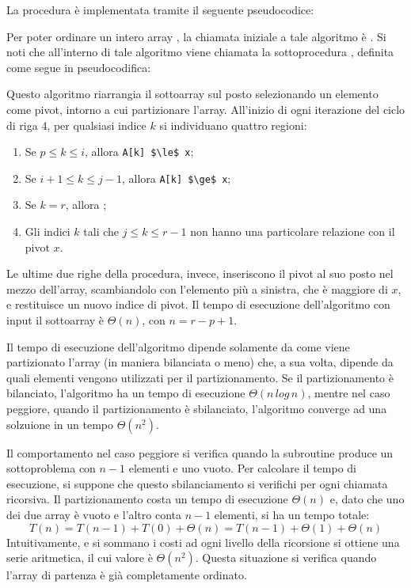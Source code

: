 La procedura  è implementata tramite il seguente pseudocodice:



Per poter ordinare un intero array , la chiamata iniziale a tale algoritmo è . Si noti che all'interno di tale algoritmo viene chiamata la sottoprocedura , definita come segue in pseudocodifica:



Questo algoritmo riarrangia il sottoarray  sul posto selezionando un elemento  come pivot, intorno a cui partizionare l'array. All'inizio di ogni iterazione del ciclo  di riga 4, per qualsiasi indice \(k\) si individuano quattro regioni:
\begin{enumerate}
  \item Se \(p\le k\le i\), allora \lstinline[mathescape]{A[k] $\le$ x};
  \item Se \(i+1\le k \le j-1\), allora \lstinline[mathescape]{A[k] $\ge$ x};
  \item Se \(k=r\), allora ;
  \item Gli indici \(k\) tali che \(j \le k \le r-1\) non hanno una particolare relazione con il pivot \(x\).
\end{enumerate}

Le ultime due righe della procedura, invece, inseriscono il pivot al suo posto nel mezzo dell'array, scambiandolo con l'elemento più a sinistra, che è maggiore di \(x\), e restituisce un nuovo indice di pivot. Il tempo di esecuzione dell'algoritmo  con input il sottoarray  è \(\Theta(n)\), con \(n=r-p+1\).

Il tempo di esecuzione dell'algoritmo  dipende solamente da come viene partizionato l'array (in maniera bilanciata o meno) che, a sua volta, dipende da quali elementi vengono utilizzati per il partizionamento. Se il partizionamento è bilanciato, l'algoritmo ha un tempo di esecuzione \(\Theta(n\,log\,n)\), mentre nel caso peggiore, quando il partizionamento è sbilanciato, l'algoritmo converge ad una solzuione in un tempo \(\Theta(n^2)\).

\vspace*{10pt}

Il comportamento nel caso peggiore si verifica quando la subroutine  produce un sottoproblema con \(n-1\) elementi e uno vuoto. Per calcolare il tempo di esecuzione, si suppone che questo sbilanciamento si verifichi per ogni chiamata ricorsiva. Il partizionamento costa un tempo di esecuzione \(\Theta(n)\) e, dato che uno dei due array è vuoto e l'altro conta \(n-1\) elementi, si ha un tempo totale:
\begin{equation*}
  T(n) = T(n-1) + T(0) + \Theta(n) = T(n-1) + \Theta(1) + \Theta(n)
\end{equation*}
Intuitivamente, e si sommano i costi ad ogni livello della ricorsione si ottiene una serie aritmetica, il cui valore è \(\Theta(n^2)\). Questa situazione si verifica quando l'array di partenza è già completamente ordinato. 

